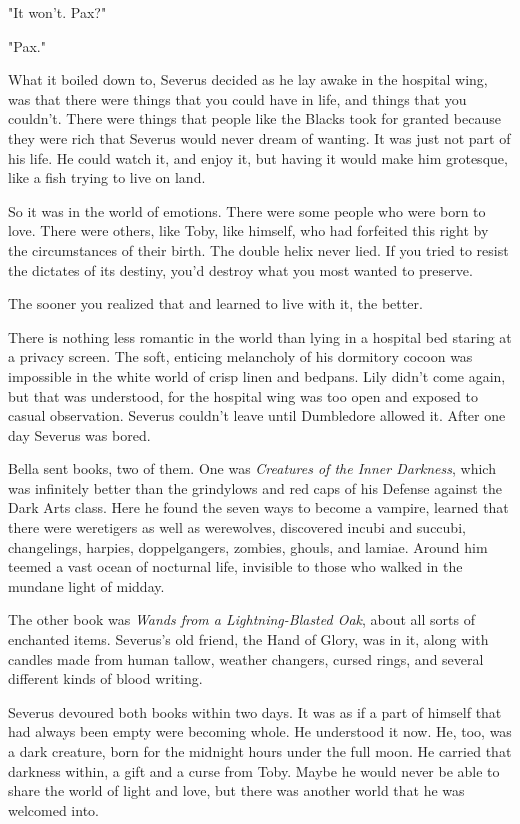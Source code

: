 \documentclass[a4paper,11pt]{article}
\begin{document}
"It won't. Pax?"

"Pax."

What it boiled down to, Severus decided as he lay awake in the hospital wing, was that there were things that you could have in life, and things that you couldn't. There were things that people like the Blacks took for granted because they were rich that Severus would never dream of wanting. It was just not part of his life. He could watch it, and enjoy it, but having it would make him grotesque, like a fish trying to live on land.

So it was in the world of emotions. There were some people who were born to love. There were others, like Toby, like himself, who had forfeited this right by the circumstances of their birth. The double helix never lied. If you tried to resist the dictates of its destiny, you'd destroy what you most wanted to preserve.

The sooner you realized that and learned to live with it, the better.

There is nothing less romantic in the world than lying in a hospital bed staring at a privacy screen. The soft, enticing melancholy of his dormitory cocoon was impossible in the white world of crisp linen and bedpans. Lily didn't come again, but that was understood, for the hospital wing was too open and exposed to casual observation. Severus couldn't leave until Dumbledore allowed it. After one day Severus was bored.

Bella sent books, two of them. One was \emph{Creatures of the Inner Darkness}, which was infinitely better than the grindylows and red caps of his Defense against the Dark Arts class. Here he found the seven ways to become a vampire, learned that there were weretigers as well as werewolves, discovered incubi and succubi, changelings, harpies, doppelgangers, zombies, ghouls, and lamiae. Around him teemed a vast ocean of nocturnal life, invisible to those who walked in the mundane light of midday.

The other book was \emph{Wands from a Lightning-Blasted Oak}, about all sorts of enchanted items. Severus's old friend, the Hand of Glory, was in it, along with candles made from human tallow, weather changers, cursed rings, and several different kinds of blood writing.

Severus devoured both books within two days. It was as if a part of himself that had always been empty were becoming whole. He understood it now. He, too, was a dark creature, born for the midnight hours under the full moon. He carried that darkness within, a gift and a curse from Toby. Maybe he would never be able to share the world of light and love, but there was another world that he was welcomed into.
\end{document}
